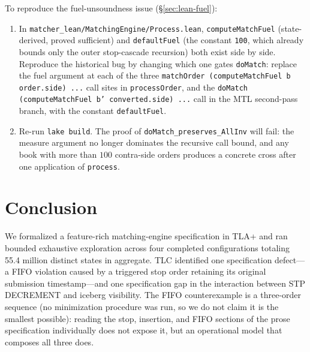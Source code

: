\documentclass[11pt,a4paper]{article}
\begin{document}
To reproduce the fuel-unsoundness issue (\S\ref{sec:lean-fuel}):
\begin{enumerate}[nosep]
\item In \texttt{matcher\_lean/MatchingEngine/Process.lean},
      \texttt{computeMatchFuel} (state-derived, proved sufficient) and
      \texttt{defaultFuel} (the constant \texttt{100}, which already
      bounds only the outer stop-cascade recursion) both exist
      side by side. Reproduce the historical bug by changing which one
      gates \texttt{doMatch}: replace the fuel argument at each of the
      three \texttt{matchOrder (computeMatchFuel b order.side) ...}
      call sites in \texttt{processOrder}, and the
      \texttt{doMatch (computeMatchFuel b' converted.side) ...} call in
      the MTL second-pass branch, with the constant
      \texttt{defaultFuel}.
\item Re-run \texttt{lake build}. The proof of
      \texttt{doMatch\_preserves\_AllInv} will fail: the measure
      argument no longer dominates the recursive call bound, and any
      book with more than $100$ contra-side orders produces a concrete
      cross after one application of \texttt{process}.
\end{enumerate}


\section{Conclusion}
\label{sec:conclusion}

We formalized a feature-rich matching-engine specification in TLA+ and
ran bounded exhaustive exploration across four completed configurations
totaling 55.4 million distinct states in aggregate. TLC identified one
specification defect---a FIFO violation caused by a triggered stop order
retaining its
original submission timestamp---and one specification gap in the
interaction between STP DECREMENT and iceberg visibility. The FIFO
counterexample is a three-order sequence (no minimization procedure was
run, so we do not claim it is the smallest possible): reading the stop,
insertion, and FIFO sections of the prose specification individually
does not expose it, but an operational model that composes all three
does.
\end{document}
